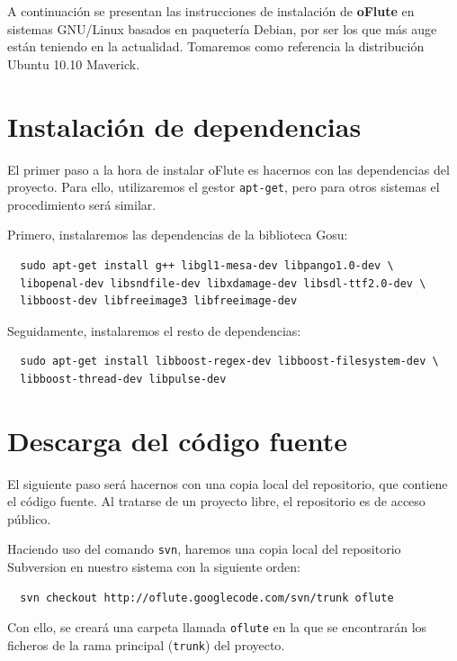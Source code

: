 A continuación se presentan las instrucciones de instalación de \textbf{oFlute}
en sistemas GNU/Linux basados en paquetería Debian\cite{refdebian}, por
ser los que más auge están teniendo en la actualidad. Tomaremos como referencia
la distribución Ubuntu 10.10 Maverick\cite{refubuntu}.

\section{Instalación de dependencias}

El primer paso a la hora de instalar oFlute es hacernos con las dependencias del
proyecto. Para ello, utilizaremos el gestor \texttt{apt-get}, pero para otros
sistemas el procedimiento será similar.

Primero, instalaremos las dependencias de la biblioteca Gosu:

\begin{verbatim}
  sudo apt-get install g++ libgl1-mesa-dev libpango1.0-dev \
  libopenal-dev libsndfile-dev libxdamage-dev libsdl-ttf2.0-dev \
  libboost-dev libfreeimage3 libfreeimage-dev
\end{verbatim}

Seguidamente, instalaremos el resto de dependencias:

\begin{verbatim}
  sudo apt-get install libboost-regex-dev libboost-filesystem-dev \ 
  libboost-thread-dev libpulse-dev
\end{verbatim}

\section{Descarga del código fuente}

El siguiente paso será hacernos con una copia local del repositorio, que
contiene el código fuente. Al tratarse de un proyecto libre, el repositorio es
de acceso público\cite{ofluteforja}.

Haciendo uso del comando \texttt{svn}, haremos una copia local del repositorio
Subversion\cite{refsubversion} en nuestro sistema con la siguiente orden:

\begin{verbatim}
  svn checkout http://oflute.googlecode.com/svn/trunk oflute
\end{verbatim}

Con ello, se creará una carpeta llamada \texttt{oflute} en la que se encontrarán
los ficheros de la rama principal (\texttt{trunk}) del proyecto.

